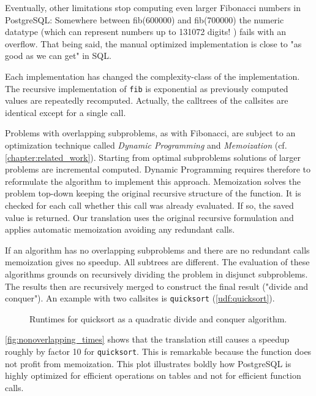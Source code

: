 Eventually, other limitations stop computing even larger Fibonacci numbers in PostgreSQL: Somewhere between fib(600000) and fib(700000) the numeric datatype (which can represent numbers up to 131072 digits! \cite[p. 124 f.]{psql}) fails with an overflow. That being said, the manual optimized implementation is close to "as good as we can get" in SQL.

Each implementation has changed the complexity-class of the implementation. The recursive implementation of \texttt{fib} is exponential as previously computed values are repeatedly recomputed. Actually, the calltrees of the callsites are identical except for a single call.

Problems with overlapping subproblems, as with Fibonacci, are subject to an optimization technique called \textit{Dynamic Programming} and \textit{Memoization} (cf. \autoref{chapter:related_work}). Starting from optimal subproblems solutions of larger problems are incremental computed. Dynamic Programming requires therefore to reformulate the algorithm to implement this approach. Memoization solves the problem top-down keeping the original recursive structure of the function. It is checked for each call whether this call was already evaluated. If so, the saved value is returned. Our translation uses the original recursive formulation and applies automatic memoization avoiding any redundant calls.

If an algorithm has no overlapping subproblems and there are no redundant calls memoization gives no speedup. All subtrees are different. The evaluation of these algorithms grounds on recursively dividing the problem in disjunct subproblems. The results then are recursively merged to construct the final result ("divide and conquer"). An example with two callsites is \texttt{quicksort} (\autoref{udf:quicksort}).

\begin{figure}[h!]
    \centering\footnotesize
    
    \caption{Runtimes for quicksort as a quadratic divide and conquer algorithm.}
    \label{fig:nonoverlapping_times}
\end{figure}

\autoref{fig:nonoverlapping_times} shows that the translation still causes a speedup roughly by factor 10 for \texttt{quicksort}. This is remarkable because the function does not profit from memoization. This plot illustrates boldly how PostgreSQL is highly optimized for efficient operations on tables and not for efficient function calls.


